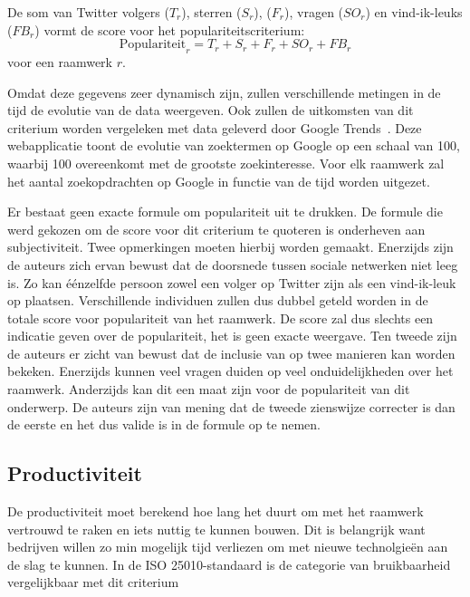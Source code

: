 De som van Twitter volgers ($T_r$), \gh{} sterren ($S_r$), \gh{}  ($F_r$), \so{} vragen ($SO_r$) en \fb{} vind-ik-leuks ($FB_r$) vormt de score voor het populariteitscriterium:
\begin{equation}
  \text{Populariteit}_r=T_r+S_r+F_r+SO_r+FB_r
  \label{eq:populariteit}
\end{equation}
voor een raamwerk $r$.

Omdat deze gegevens zeer dynamisch zijn, zullen verschillende metingen in de tijd de evolutie van de data weergeven.
Ook zullen de uitkomsten van dit criterium worden vergeleken met data geleverd door Google Trends~\cite{Google2012a}.
Deze webapplicatie toont de evolutie van zoektermen op Google op een schaal van 100, waarbij 100 overeenkomt met de grootste zoekinteresse.
Voor elk raamwerk zal het aantal zoekopdrachten op Google in functie van de tijd worden uitgezet.

Er bestaat geen exacte formule om populariteit uit te drukken.
De formule die werd gekozen om de score voor dit criterium te quoteren is onderheven aan subjectiviteit.
Twee opmerkingen moeten hierbij worden gemaakt.
Enerzijds zijn de auteurs zich ervan bewust dat de doorsnede tussen sociale netwerken niet leeg is.
Zo kan éénzelfde persoon zowel een volger op Twitter zijn als een vind-ik-leuk op \fb{} plaatsen.
Verschillende individuen zullen dus dubbel geteld worden in de totale score voor populariteit van het raamwerk.
De score zal dus slechts een indicatie geven over de populariteit,  het is geen exacte weergave.
Ten tweede zijn de auteurs er zicht van bewust dat de inclusie van \so{} op twee manieren kan worden bekeken.
Enerzijds kunnen veel vragen duiden op veel onduidelijkheden over het raamwerk.
Anderzijds kan dit een maat zijn voor de populariteit van dit onderwerp.
De auteurs zijn van mening dat de tweede zienswijze correcter is dan de eerste en het dus valide is \so{} in de formule op te nemen.


\subsection{Productiviteit}
\label{sec:vergelijking-productiviteit}
De productiviteit moet berekend hoe lang het duurt om met het raamwerk vertrouwd te raken en iets nuttig te kunnen bouwen.
Dit is belangrijk want bedrijven willen zo min mogelijk tijd verliezen om met nieuwe technolgieën aan de slag te kunnen.
In de ISO 25010-standaard is de categorie van bruikbaarheid vergelijkbaar met dit criterium

